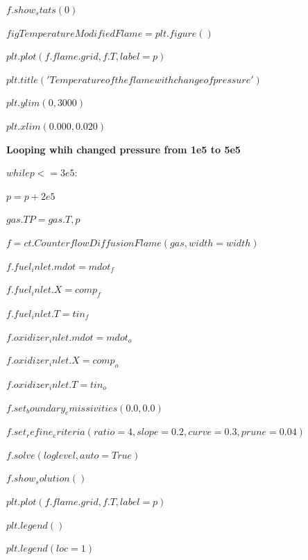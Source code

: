 \documentclass[a4paper]{article}
\begin{document}
$f.show_stats(0)$

$figTemperatureModifiedFlame = plt.figure()$

$plt.plot(f.flame.grid, f.T, label=p )$

$plt.title('Temperature of the flame with change of pressure')$

$plt.ylim(0,3000)$

$plt.xlim(0.000, 0.020)$

\textbf{Looping whih changed pressure from 1e5 to 5e5}

$while p <= 3e5:$

\hspace{5,35mm}$    p=p+2e5$

\hspace{5,35mm}$    gas.TP = gas.T, p$

\hspace{5,35mm}$    f = ct.CounterflowDiffusionFlame(gas, width=width)$

\hspace{5,35mm}$    f.fuel_inlet.mdot = mdot_f$

\hspace{5,35mm}$    f.fuel_inlet.X = comp_f$

\hspace{5,35mm}$    f.fuel_inlet.T = tin_f$

\hspace{5,35mm}$    f.oxidizer_inlet.mdot = mdot_o$

\hspace{5,35mm}$    f.oxidizer_inlet.X = comp_o$

\hspace{5,35mm}$    f.oxidizer_inlet.T = tin_o$

\hspace{5,35mm}$    f.set_boundary_emissivities(0.0, 0.0)$

\hspace{5,35mm}$    f.set_refine_criteria(ratio=4, slope=0.2, curve=0.3, prune=0.04)$

\hspace{5,35mm}$    f.solve(loglevel, auto=True)$

\hspace{5,35mm}$    f.show_solution()$

\hspace{5,35mm}$    plt.plot(f.flame.grid, f.T, label=p)$

\hspace{5,35mm}$    plt.legend()$

\hspace{5,35mm}$    plt.legend(loc=1)$
\end{document}
